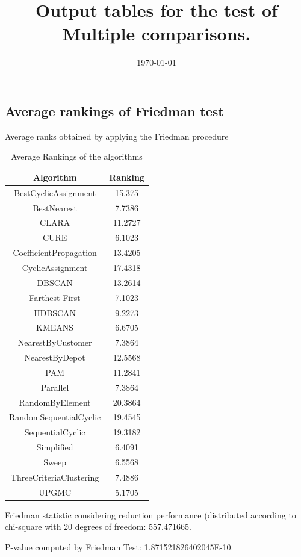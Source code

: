 \documentclass[a4paper,10pt]{article}
\title{Output tables for the test of Multiple comparisons.}
\author{}
\date{\today}
\begin{document}
\begin{landscape}
\pagestyle{empty}
\maketitle
\thispagestyle{empty}
\section{Average rankings of Friedman test}



Average ranks obtained by applying the Friedman procedure

\begin{table}[!htp]
\centering
\begin{tabular}{|c|c|}\hline
Algorithm&Ranking\\\hline
BestCyclicAssignment & 15.375\\
BestNearest & 7.7386\\
CLARA & 11.2727\\
CURE & 6.1023\\
CoefficientPropagation & 13.4205\\
CyclicAssignment & 17.4318\\
DBSCAN & 13.2614\\
Farthest-First & 7.1023\\
HDBSCAN & 9.2273\\
KMEANS & 6.6705\\
NearestByCustomer & 7.3864\\
NearestByDepot & 12.5568\\
PAM & 11.2841\\
Parallel & 7.3864\\
RandomByElement & 20.3864\\
RandomSequentialCyclic & 19.4545\\
SequentialCyclic & 19.3182\\
Simplified & 6.4091\\
Sweep & 6.5568\\
ThreeCriteriaClustering & 7.4886\\
UPGMC & 5.1705\\
\hline
\end{tabular}
\caption{Average Rankings of the algorithms}
\end{table}

Friedman statistic considering reduction performance (distributed according to chi-square with 20 degrees of freedom: 557.471665.

P-value computed by Friedman Test: 1.871521826402045E-10.\newline


\end{landscape}
\end{document}
